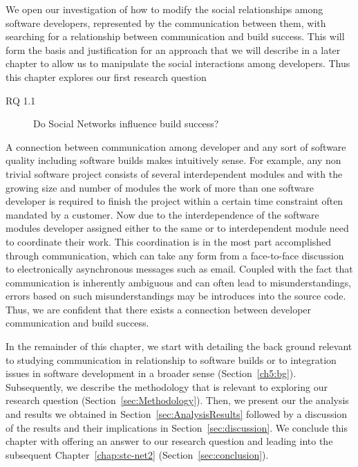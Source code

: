\label{chap:soc-net}
We open our investigation of how to modify the social relationships among software developers, represented by the communication between them, with searching for a relationship between communication and build success.
This will form the basis and justification for an approach that we will describe in a later chapter to allow us to manipulate the social interactions among developers.
Thus this chapter explores our first research question
\begin{description}
\item[RQ 1.1] Do Social Networks influence build success?
\end{description}

A connection between communication among developer and any sort of software quality including software builds makes intuitively sense.
For example, any non trivial software project consists of several interdependent modules and with the growing size and number of modules the work of more than one software developer is required to finish the project within a certain time constraint often mandated by a customer.
Now due to the interdependence of the software modules developer assigned either to the same or to interdependent module need to coordinate their work.
This coordination is in the most part accomplished through communication, which can take any form from a face-to-face discussion to electronically asynchronous messages such as email.
Coupled with the fact that communication is inherently ambiguous and can often lead to misunderstandings, errors based on such misunderstandings may be introduces into the source code.
Thus, we are confident that there exists  a connection between developer communication and build success.

In the remainder of this chapter, we start with detailing the back ground relevant to studying communication in relationship to software builds or to integration issues in software development in a broader sense (Section~\ref{ch5:bg}).
Subsequently, we describe the methodology that is relevant to exploring our research question (Section~\ref{sec:Methodology}).
Then, we present our the analysis and results we obtained in Section~\ref{sec:AnalysisResults} followed by a discussion of the results and their implications in Section~\ref{sec:discussion}.
We conclude this chapter with offering an answer to our research question and leading into the subsequent Chapter~\ref{chap:stc-net2} (Section~\ref{sec:conclusion}).


